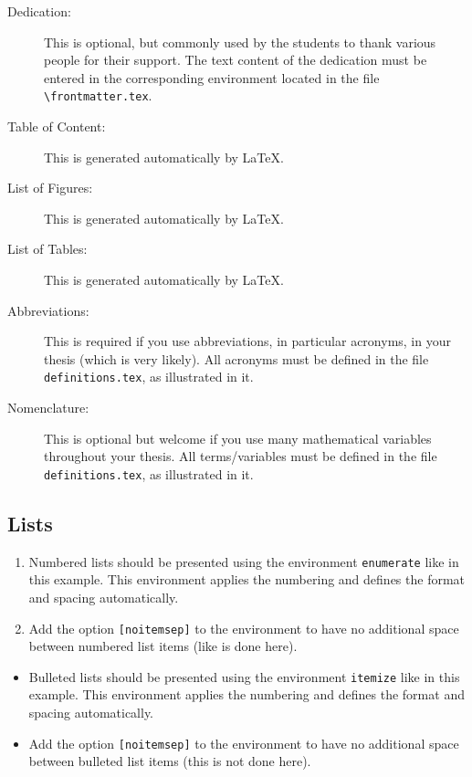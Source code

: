 \documentclass[11pt,twoside,openright]{report}
\begin{document}
\begin{description}
    \item [Dedication:] This is optional, but commonly used by the students to thank various people for their support.  The text content of the dedication must be entered in the corresponding environment located in the file \verb|\frontmatter.tex|.
    
    \item [Table of Content:] This is generated automatically by \LaTeX{}.
    
    \item [List of Figures:] This is generated automatically by \LaTeX{}.
    
    \item [List of Tables:] This is generated automatically by \LaTeX{}.
    
    \item [Abbreviations:] This is required if you use abbreviations, in particular acronyms, in your thesis (which is very likely). All acronyms must be defined in the file \verb|definitions.tex|, as illustrated in it.
    
    \item [Nomenclature:] This is optional but welcome if you use many mathematical variables throughout your thesis. All terms/variables must be defined in the file \verb|definitions.tex|, as illustrated in it. 
\end{description}


\subsection{Lists}
\label{subsec:lists}

\begin{enumerate}[noitemsep]
  \item Numbered lists should be presented using the environment \verb|enumerate| like in this example. 
  This environment applies the numbering and defines the format and spacing automatically. 
  \item Add the option \verb|[noitemsep]| to the environment to have no additional space between numbered list items (like is done here).
\end{enumerate}

\begin{itemize}
  \item Bulleted lists should be presented using the environment \verb|itemize| like in this example. 
  This environment applies the numbering and defines the format and spacing automatically. 
  \item Add the option \verb|[noitemsep]| to the environment to have no additional space between bulleted list items  (this is not done here).
\end{itemize}
\end{document}
